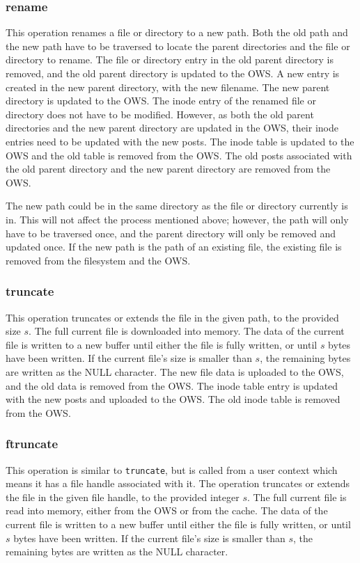 \subsubsection{rename}
This operation renames a file or directory to a new path. Both the old path and the new path have to be traversed to locate the parent directories and the file or directory to rename. The file or directory entry in the old parent directory is removed, and the old parent directory is updated to the \gls{OWS}. A new entry is created in the new parent directory, with the new filename. The new parent directory is updated to the \gls{OWS}. The inode entry of the renamed file or directory does not have to be modified. However, as both the old parent directories and the new parent directory are updated in the \gls{OWS}, their inode entries need to be updated with the new posts. The inode table is updated to the \gls{OWS} and the old table is removed from the \gls{OWS}. The old posts associated with the old parent directory and the new parent directory are removed from the \gls{OWS}.

The new path could be in the same directory as the file or directory currently is in. This will not affect the process mentioned above; however, the path will only have to be traversed once, and the parent directory will only be removed and updated once. If the new path is the path of an existing file, the existing file is removed from the filesystem and the \gls{OWS}.

\subsubsection{truncate}
This operation truncates or extends the file in the given path, to the provided size $s$. The full current file is downloaded into memory. The data of the current file is written to a new buffer until either the file is fully written, or until $s$ bytes have been written. If the current file's size is smaller than $s$, the remaining bytes are written as the NULL character. The new file data is uploaded to the \gls{OWS}, and the old data is removed from the \gls{OWS}. The inode table entry is updated with the new posts and uploaded to the \gls{OWS}. The old inode table is removed from the \gls{OWS}.

\subsubsection{ftruncate}
This operation is similar to \texttt{truncate}, but is called from a user context which means it has a file handle associated with it. The operation truncates or extends the file in the given file handle, to the provided integer $s$. The full current file is read into memory, either from the \gls{OWS} or from the cache. The data of the current file is written to a new buffer until either the file is fully written, or until $s$ bytes have been written. If the current file's size is smaller than $s$, the remaining bytes are written as the NULL character.

